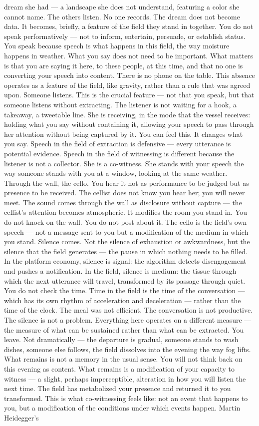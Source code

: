 dream she had — a landscape she does not understand, featuring a color she cannot name. The others listen. No one records. The dream does not become data. It becomes, briefly, a feature of the field they stand in together. You do not speak performatively — not to inform, entertain, persuade, or establish status. You speak because speech is what happens in this field, the way moisture happens in weather. What you say does not need to be important. What matters is that you are saying it here, to these people, at this time, and that no one is converting your speech into content. There is no phone on the table. This absence operates as a feature of the field, like gravity, rather than a rule that was agreed upon. Someone listens. This is the crucial feature — not that you speak, but that someone listens without extracting. The listener is not waiting for a hook, a takeaway, a tweetable line. She is receiving, in the mode that the vessel receives: holding what you say without containing it, allowing your speech to pass through her attention without being captured by it. You can feel this. It changes what you say. Speech in the field of extraction is defensive — every utterance is potential evidence. Speech in the field of witnessing is different because the listener is not a collector. She is a co-witness. She stands with your speech the way someone stands with you at a window, looking at the same weather. Through the wall, the cello. You hear it not as performance to be judged but as presence to be received. The cellist does not know you hear her; you will never meet. The sound comes through the wall as disclosure without capture — the cellist’s attention becomes atmospheric. It modifies the room you stand in. You do not knock on the wall. You do not post about it. The cello is the field’s own speech — not a message sent to you but a modification of the medium in which you stand. Silence comes. Not the silence of exhaustion or awkwardness, but the silence that the field generates — the pause in which nothing needs to be filled. In the platform economy, silence is signal: the algorithm detects disengagement and pushes a notification. In the field, silence is medium: the tissue through which the next utterance will travel, transformed by its passage through quiet. You do not check the time. Time in the field is the time of the conversation — which has its own rhythm of acceleration and deceleration — rather than the time of the clock. The meal was not efficient. The conversation is not productive. The silence is not a problem. Everything here operates on a different measure — the measure of what can be sustained rather than what can be extracted. You leave. Not dramatically — the departure is gradual, someone stands to wash dishes, someone else follows, the field dissolves into the evening the way fog lifts. What remains is not a memory in the usual sense. You will not think back on this evening as content. What remains is a modification of your capacity to witness — a slight, perhaps imperceptible, alteration in how you will listen the next time. The field has metabolized your presence and returned it to you transformed. This is what co-witnessing feels like: not an event that happens to you, but a modification of the conditions under which events happen. Martin Heidegger’s 